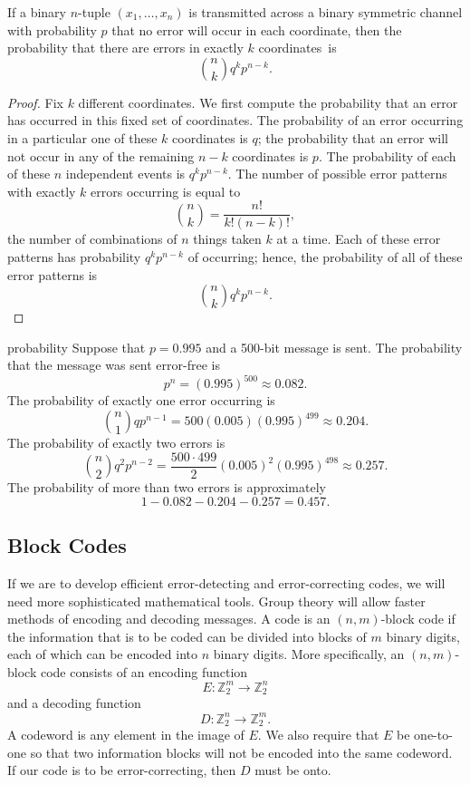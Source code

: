  
\begin{theorem}
If a binary $n$-tuple $(x_{1}, \ldots, x_{n})$ is transmitted across a
binary symmetric channel with probability $p$ that no error will occur
in each coordinate, then the probability that there are errors in
exactly $k$ coordinates~is
\[
\binom{n}{k} q^kp^{n-k}.
\]
\end{theorem}
 
 
\begin{proof}
Fix $k$ different coordinates. We first compute the probability that
an error has occurred in this fixed set of coordinates. The
probability of an error occurring in a particular one of these $k$
coordinates is $q$; the probability that an error will not occur
in any of the remaining $n-k$ coordinates is $p$. The
probability of each of these $n$ independent events is
$q^{k}p^{n-k}$. The number of possible error patterns with exactly $k$
errors occurring is equal to 
\[
\binom{n}{k} 
= \frac{n!}{k!(n-k)!},
\]
the number of combinations of $n$ things taken $k$ at a time. Each of
these error patterns has probability $q^{k}p^{n-k}$ of occurring;
hence, the probability of all of these error patterns is
\[
\binom{n}{k} 
q^{k}p^{n-k}.
\]
\end{proof}
 
 
\begin{example}{probability}
Suppose that $p = 0.995$ and a 500-bit message is sent. The
probability that the message was sent error-free is 
\[
p^{n} = (0.995)^{500} \approx 0.082.
\]
The probability of exactly one error occurring is
\[
\binom{n}{1} 
qp^{n-1}= 500(0.005)(0.995)^{499}
\approx 0.204.
\]
The probability of exactly two errors is
\[
\binom{n}{2} 
q^{2}p^{n-2}=
\frac{500 \cdot 499}{2}(0.005)^{2}(0.995)^{498} \approx
0.257.
\]
The probability of more than two errors is approximately
\[
1-0.082-0.204 -0.257=0.457.
\]
\end{example}
 
 
\subsection*{Block Codes}
 
 
If we are to develop efficient error-detecting and error-correcting
codes, we will need more sophisticated mathematical tools.  Group
theory  will allow faster methods of encoding and decoding messages. A
code is an $(n, m)$-{\bfi block code\/} if the information that is to be
coded can be divided into blocks of $m$ binary digits, each of which
can be encoded into $n$ binary digits. More specifically, an $(n,
m)$-block code consists of an {\bfi encoding function} 
\[
E:{\mathbb Z}^{m}_{2} \rightarrow {\mathbb Z}^{n}_{2}
\]
and a {\bfi decoding function}
\[
D:{\mathbb Z}^{n}_{2} \rightarrow {\mathbb Z}^{m}_{2}.
\]
A {\bfi codeword\/} is any element in the image of $E$. We also require
that $E$ be one-to-one so that two information blocks will not be
encoded into the same codeword. If our code is to be error-correcting,
then $D$ must be onto.
 
